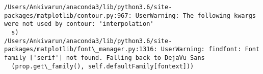 \documentclass[11pt]{article}
\begin{document}
    \begin{Verbatim}[commandchars=\\\{\}]
/Users/Ankivarun/anaconda3/lib/python3.6/site-packages/matplotlib/contour.py:967: UserWarning: The following kwargs were not used by contour: 'interpolation'
  s)
/Users/Ankivarun/anaconda3/lib/python3.6/site-packages/matplotlib/font\_manager.py:1316: UserWarning: findfont: Font family ['serif'] not found. Falling back to DejaVu Sans
  (prop.get\_family(), self.defaultFamily[fontext]))

    \end{Verbatim}

    \begin{center}
    \end{center}
    { \hspace*{\fill} \\}
    
\end{document}
